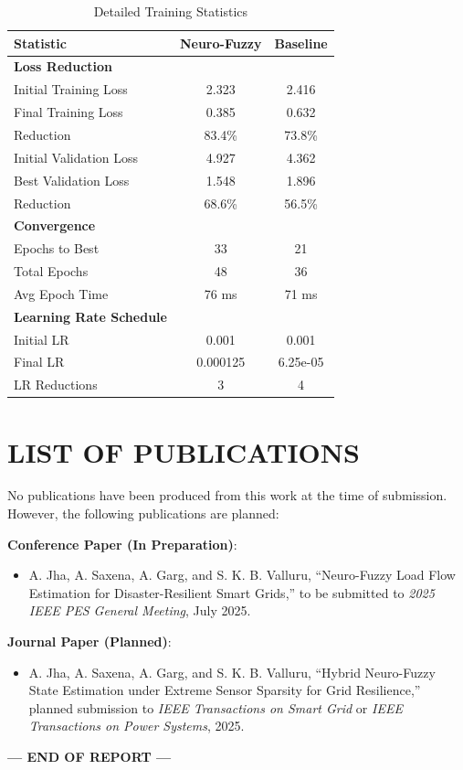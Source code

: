 \documentclass[12pt,a4paper]{report}
\begin{document}
\begin{table}[ht]
\centering
\caption{Detailed Training Statistics}
\begin{tabular}{lcc}
\toprule
\textbf{Statistic} & \textbf{Neuro-Fuzzy} & \textbf{Baseline} \\
\midrule
\textbf{Loss Reduction} & & \\
Initial Training Loss & 2.323 & 2.416 \\
Final Training Loss & 0.385 & 0.632 \\
Reduction & 83.4\% & 73.8\% \\
\midrule
Initial Validation Loss & 4.927 & 4.362 \\
Best Validation Loss & 1.548 & 1.896 \\
Reduction & 68.6\% & 56.5\% \\
\midrule
\textbf{Convergence} & & \\
Epochs to Best & 33 & 21 \\
Total Epochs & 48 & 36 \\
Avg Epoch Time & 76 ms & 71 ms \\
\midrule
\textbf{Learning Rate Schedule} & & \\
Initial LR & 0.001 & 0.001 \\
Final LR & 0.000125 & 6.25e-05 \\
LR Reductions & 3 & 4 \\
\bottomrule
\end{tabular}
\end{table}

\chapter*{LIST OF PUBLICATIONS}

No publications have been produced from this work at the time of submission. However, the following publications are planned:

\textbf{Conference Paper (In Preparation)}:
\begin{itemize}
    \item A. Jha, A. Saxena, A. Garg, and S. K. B. Valluru, ``Neuro-Fuzzy Load Flow Estimation for Disaster-Resilient Smart Grids,'' to be submitted to \textit{2025 IEEE PES General Meeting}, July 2025.
\end{itemize}

\textbf{Journal Paper (Planned)}:
\begin{itemize}
    \item A. Jha, A. Saxena, A. Garg, and S. K. B. Valluru, ``Hybrid Neuro-Fuzzy State Estimation under Extreme Sensor Sparsity for Grid Resilience,'' planned submission to \textit{IEEE Transactions on Smart Grid} or \textit{IEEE Transactions on Power Systems}, 2025.
\end{itemize}

\vspace{20mm}

\begin{center}
\textbf{--- END OF REPORT ---}
\end{center}
\end{document}
